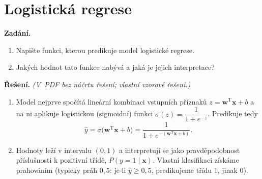 \section{Logistická regrese}

\noindent\textbf{Zadání.}\par
\begin{enumerate}
  \item Napište funkci, kterou predikuje model logistické regrese.
  \item Jakých hodnot tato funkce nabývá a jaká je jejich interpretace?
\end{enumerate}

\medskip
\noindent\textbf{Řešení.} \textit{(V~PDF bez náčrtu řešení; vlastní vzorové řešení.)}\par
\begin{enumerate}
  \item Model nejprve spočítá lineární kombinaci vstupních příznaků
    $z = \mathbf{w}^{\mathrm T}\mathbf{x} + b$ a na ni aplikuje logistickou (sigmoidní)
    funkci $\sigma(z) = \dfrac{1}{1+e^{-z}}$. Predikuje tedy
    \[ \hat y = \sigma\!\big(\mathbf{w}^{\mathrm T}\mathbf{x} + b\big) = \frac{1}{1+e^{-(\mathbf{w}^{\mathrm T}\mathbf{x}+b)}}. \]
  \item Hodnoty leží v intervalu $(0,1)$ a interpretují se jako pravděpodobnost
    příslušnosti k pozitivní třídě, $P(y{=}1 \mid \mathbf{x})$. Vlastní klasifikaci získáme
    prahováním (typicky práh $0{,}5$: je-li $\hat y \ge 0{,}5$, predikujeme třídu $1$, jinak $0$).
\end{enumerate}

